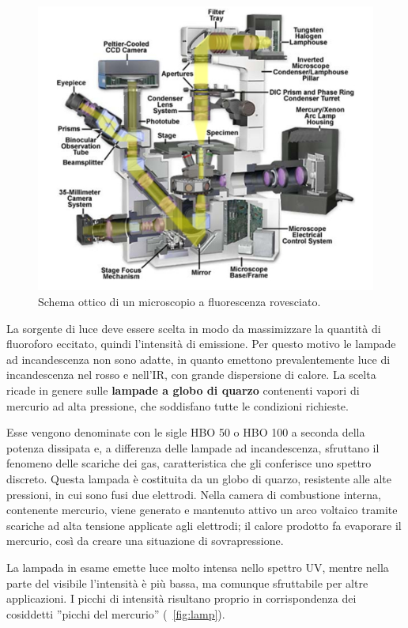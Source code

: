 \begin{figure}[!ht]
 \centering
 \includegraphics[scale=.50]{img/CAP2microrovesciato.jpg}
 \caption{\small{Schema ottico di un microscopio a fluorescenza rovesciato.}}
 \label{fig:micro}
\end{figure}

La sorgente di luce deve essere scelta in modo da massimizzare la quantità di fluoroforo eccitato, quindi l'intensità di emissione. Per questo motivo le lampade ad incandescenza non sono adatte, in quanto emettono prevalentemente luce di incandescenza nel rosso e nell'IR, con grande dispersione di calore. La scelta ricade in genere sulle \textbf{lampade a globo di quarzo} contenenti vapori di mercurio ad alta pressione, che soddisfano tutte le condizioni richieste. 

Esse vengono denominate con le sigle HBO 50 o HBO 100 a seconda della potenza dissipata e, a differenza delle lampade ad incandescenza, sfruttano il fenomeno delle scariche dei gas, caratteristica che gli conferisce uno spettro discreto. Questa lampada è costituita da un globo di quarzo, resistente alle alte pressioni, in cui sono fusi due elettrodi. Nella camera di combustione interna, contenente mercurio, viene generato e mantenuto attivo un arco voltaico tramite scariche ad alta tensione applicate agli elettrodi; il calore prodotto fa evaporare il mercurio, così da creare una situazione di sovrapressione. 

La lampada in esame emette luce molto intensa nello spettro UV, mentre nella parte del visibile l'intensità è più bassa, ma comunque sfruttabile per altre applicazioni. I picchi di intensità risultano proprio in corrispondenza dei cosiddetti ''picchi del mercurio'' (\figurename~\ref{fig:lamp}). \\


